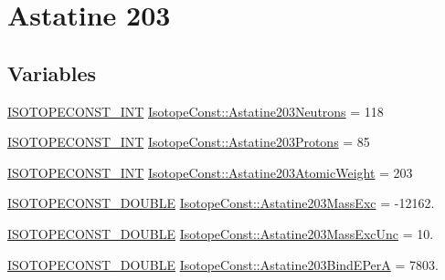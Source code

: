 \hypertarget{group___isotope_const-_astatine-_at203}{}\section{Astatine 203}
\label{group___isotope_const-_astatine-_at203}
\subsection*{Variables}
\begin{DoxyCompactItemize}
\item 
\mbox{\hyperlink{group___isotope_const-_macros_ga5f18360b3e99483a35c32d789e62621c}{I\+S\+O\+T\+O\+P\+E\+C\+O\+N\+S\+T\+\_\+\+I\+NT}} \mbox{\hyperlink{group___isotope_const-_astatine-_at203_gadb106d945fa1aecc6e78ee3a0c93c5f9}{Isotope\+Const\+::\+Astatine203\+Neutrons}} = 118
\item 
\mbox{\hyperlink{group___isotope_const-_macros_ga5f18360b3e99483a35c32d789e62621c}{I\+S\+O\+T\+O\+P\+E\+C\+O\+N\+S\+T\+\_\+\+I\+NT}} \mbox{\hyperlink{group___isotope_const-_astatine-_at203_ga1f46acb9489938ca889dac1f53b1476c}{Isotope\+Const\+::\+Astatine203\+Protons}} = 85
\item 
\mbox{\hyperlink{group___isotope_const-_macros_ga5f18360b3e99483a35c32d789e62621c}{I\+S\+O\+T\+O\+P\+E\+C\+O\+N\+S\+T\+\_\+\+I\+NT}} \mbox{\hyperlink{group___isotope_const-_astatine-_at203_ga69594decdae59cc40e67fe0effad1c65}{Isotope\+Const\+::\+Astatine203\+Atomic\+Weight}} = 203
\item 
\mbox{\hyperlink{group___isotope_const-_macros_ga8f45a7272ce02c0b4c65c44636ed719a}{I\+S\+O\+T\+O\+P\+E\+C\+O\+N\+S\+T\+\_\+\+D\+O\+U\+B\+LE}} \mbox{\hyperlink{group___isotope_const-_astatine-_at203_ga24d008b333aaf17f91c94a3d686a0605}{Isotope\+Const\+::\+Astatine203\+Mass\+Exc}} = -\/12162.
\item 
\mbox{\hyperlink{group___isotope_const-_macros_ga8f45a7272ce02c0b4c65c44636ed719a}{I\+S\+O\+T\+O\+P\+E\+C\+O\+N\+S\+T\+\_\+\+D\+O\+U\+B\+LE}} \mbox{\hyperlink{group___isotope_const-_astatine-_at203_gaaacef532c76713d525c1c0f10872739b}{Isotope\+Const\+::\+Astatine203\+Mass\+Exc\+Unc}} = 10.
\item 
\mbox{\hyperlink{group___isotope_const-_macros_ga8f45a7272ce02c0b4c65c44636ed719a}{I\+S\+O\+T\+O\+P\+E\+C\+O\+N\+S\+T\+\_\+\+D\+O\+U\+B\+LE}} \mbox{\hyperlink{group___isotope_const-_astatine-_at203_gac387cb10526cc8bb450be8cf51b0e5f9}{Isotope\+Const\+::\+Astatine203\+Bind\+E\+PerA}} = 7803.
\item 

\end{DoxyCompactItemize}
